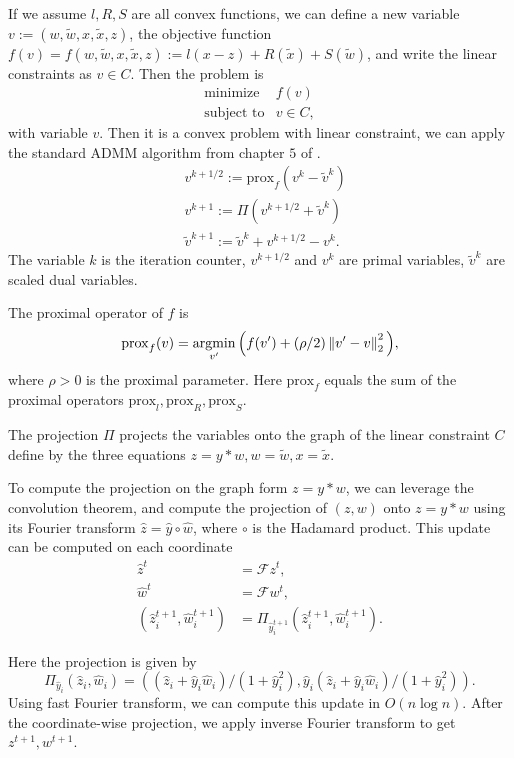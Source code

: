 \documentclass[12pt]{article}
\begin{document}
If we assume $l,R,S$ are all convex functions, we can define a new variable $v := (w, \tilde{w},x, \tilde{x}, z)$, 
the objective function $f(v) = f(w, \tilde{w},x, \tilde{x}, z):=l(x-z)+R(\tilde{x})+ S(\tilde{w})$, and write the linear constraints as $v\in C$. 
Then the problem is
\[
\begin{array}{ll}
\mbox{minimize}   & f(v) \\
\mbox{subject to} & v\in C,
\end{array}
\]
with variable $v$.
Then it is a convex problem with linear constraint, we can apply the standard ADMM algorithm from chapter $5$ of \cite{boyd2011distributed}. 
\[
\begin{array}{ll}
&v^{k+1/2} := \mathrm{prox}_{f}(v^{k}-\tilde{v}^{k})\\
&v^{k+1} :=  \Pi\left(v^{k+1/2}+\tilde{v}^k\right)\\
&\tilde{v}^{k+1} :=  \tilde{v}^k + v^{k+1/2} - v^k.
\end{array}
\]
The variable $k$ is the iteration counter, $v^{k+1/2}$ and $v^{k}$  are primal
variables, $\tilde{v}^k$ are scaled dual variables.

The proximal operator of $f$ is
\[
    \mathrm{prox}_{f}(v) = \mathop{\rm argmin}_{v'}\Big(f(v') + (\rho/2) \left\|v' - v\right\|_2^2\Big),
\]
where $\rho>0$ is the proximal parameter. Here $\mathrm{prox}_{f}$ equals the sum of the proximal operators $\mathrm{prox}_{l},\mathrm{prox}_{R},\mathrm{prox}_{S}$.

The projection $\Pi$ projects the variables onto the graph of the linear constraint $C$ define by the three equations $z = y*w, w = \tilde{w}, x = \tilde{x}$. 

To compute the projection on the graph form  $z = y*w$, we can leverage the convolution theorem, 
and compute the projection of $(z,w)$ onto $z = y*w$ using its Fourier transform  $\hat z =\hat y  \circ \hat w$, where $ \circ$ is the Hadamard product.  
This update can be computed on each coordinate
\[
\begin{array}{ll}
    \hat z^{t} &= \mathcal{F}  z^{t},\\
    \hat w^{t} &= \mathcal{F}  w^{t}, \\
 (\hat z^{t+1}_i, \hat w^{t+1}_i) &= \Pi_{\hat y^{t+1}_i}(\hat z^{t+1}_i, \hat w^{t+1}_i).
\end{array}
\]
  
Here the projection is given by
\[
 \Pi_{\hat y_i}(\hat z_i, \hat w_i)= ((\hat z_i+ \hat y_i \hat w_i)/(1+\hat y_i^2), \hat y_i(\hat z_i+ \hat y_i \hat w_i)/(1+\hat y_i^2)).
\]
 Using fast Fourier transform, we can compute this update in $O(n\log n)$.
 After the coordinate-wise projection, we apply inverse Fourier transform to get 
 $z^{t+1}, w^{t+1}$.
\end{document}
